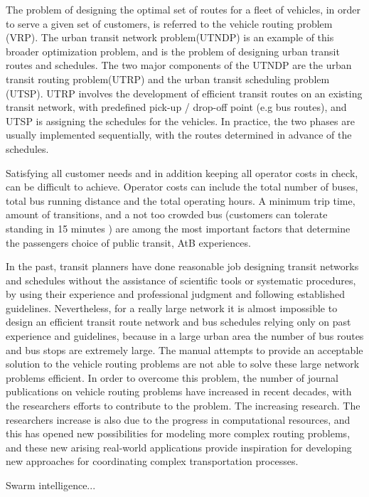 The problem of designing the optimal set of routes for a fleet of vehicles, in order to serve a given set of customers, is referred to the vehicle routing problem (VRP). The urban transit network problem(UTNDP) is an example of this broader optimization problem, and is the problem of designing urban transit routes and schedules. The two major components of the UTNDP are the urban transit routing problem(UTRP) and the urban transit scheduling problem (UTSP). UTRP involves the development of efficient transit routes on an existing transit network, with predefined pick-up / drop-off point (e.g bus routes), and UTSP is assigning the schedules for the vehicles. In practice, the two phases are usually implemented sequentially, with the routes determined in advance of the schedules.

Satisfying all customer needs and in addition keeping all operator costs in check, can be difficult to achieve. Operator costs can include the total number of buses, total bus running distance and the total operating hours. A minimum trip time, amount of transitions, and a not too crowded bus (customers can tolerate standing in 15 minutes ) are among the most important factors that determine the passengers choice of public transit, AtB experiences. 

In the past, transit planners have done reasonable job designing transit networks and schedules without the assistance of scientific tools or systematic procedures, by using their experience and professional judgment and following established  guidelines. Nevertheless, for a really large network it is almost impossible to design an efficient transit route network and bus schedules relying only on past experience and guidelines, because in a large urban area the number of bus routes and bus stops are extremely large. The manual attempts to provide an acceptable solution to the vehicle routing problems are not able to solve these large network problems efficient. In order to overcome this problem, the number of journal publications on vehicle routing problems have increased in recent decades, with the researchers efforts to contribute to the problem. The increasing research. The researchers increase is also due to the progress in computational resources, and this has opened new possibilities for modeling more complex routing problems, and these new arising real-world applications provide inspiration for developing new approaches for coordinating complex transportation processes. 

Swarm intelligence...





